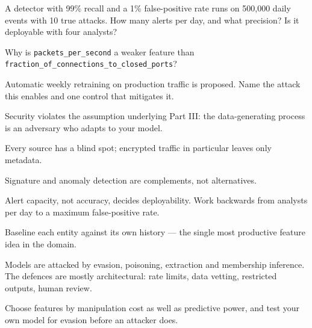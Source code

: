 \begin{checkpoint}
\begin{tightnum}
  \item A detector with 99\% recall and a 1\% false-positive rate runs on 500{,}000
        daily events with 10 true attacks. How many alerts per day, and what
        precision? Is it deployable with four analysts?
  \item Why is \texttt{packets\_per\_second} a weaker feature than
        \texttt{fraction\_of\_connections\_to\_closed\_ports}?
  \item Automatic weekly retraining on production traffic is proposed. Name the
        attack this enables and one control that mitigates it.
\end{tightnum}
\end{checkpoint}

\begin{chaptersummary}
\begin{tight}
  \item Security violates the assumption underlying Part III: the data-generating
        process is an adversary who adapts to your model.
  \item Every source has a blind spot; encrypted traffic in particular leaves only
        metadata.
  \item Signature and anomaly detection are complements, not alternatives.
  \item Alert capacity, not accuracy, decides deployability. Work backwards from
        analysts per day to a maximum false-positive rate.
  \item Baseline each entity against its own history --- the single most productive
        feature idea in the domain.
  \item Models are attacked by evasion, poisoning, extraction and membership
        inference. The defences are mostly architectural: rate limits, data vetting,
        restricted outputs, human review.
  \item Choose features by manipulation cost as well as predictive power, and test
        your own model for evasion before an attacker does.
\end{tight}
\end{chaptersummary}

